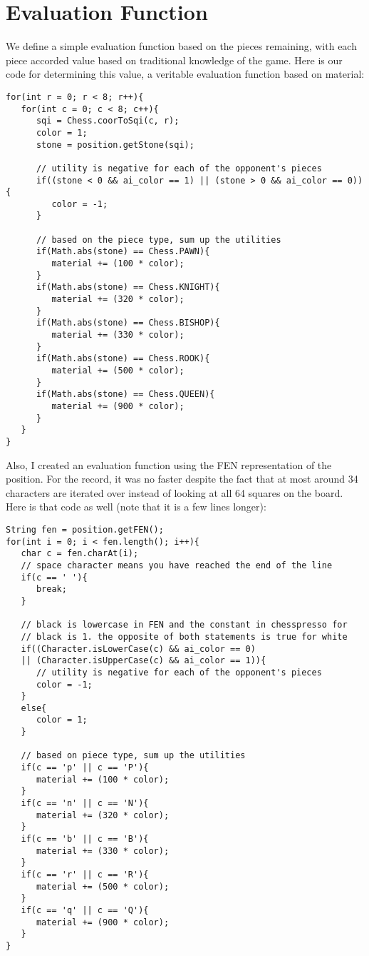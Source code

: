 \documentclass[11pt, oneside]{article}%
\begin{document}
\section{Evaluation Function}
We define a simple evaluation function based on the pieces remaining, with each piece accorded value based on traditional knowledge of the game.  Here is our code for determining this value, a veritable evaluation function based on material:
\begin{lstlisting}
for(int r = 0; r < 8; r++){
   for(int c = 0; c < 8; c++){
      sqi = Chess.coorToSqi(c, r);
      color = 1;
      stone = position.getStone(sqi);

      // utility is negative for each of the opponent's pieces
      if((stone < 0 && ai_color == 1) || (stone > 0 && ai_color == 0)){
         color = -1;
      }

      // based on the piece type, sum up the utilities
      if(Math.abs(stone) == Chess.PAWN){
         material += (100 * color);
      }
      if(Math.abs(stone) == Chess.KNIGHT){
         material += (320 * color);
      }
      if(Math.abs(stone) == Chess.BISHOP){
         material += (330 * color);
      }
      if(Math.abs(stone) == Chess.ROOK){
         material += (500 * color);
      }
      if(Math.abs(stone) == Chess.QUEEN){
         material += (900 * color);
      }
   }
}
\end{lstlisting}
\newpage
Also, I created an evaluation function using the FEN representation of the position.  For the record, it was no faster despite the fact that at most around 34 characters are iterated over instead of looking at all 64 squares on the board.  Here is that code as well (note that it is a few lines longer):

\begin{lstlisting}
String fen = position.getFEN();
for(int i = 0; i < fen.length(); i++){
   char c = fen.charAt(i);
   // space character means you have reached the end of the line
   if(c == ' '){
      break;
   }
            
   // black is lowercase in FEN and the constant in chesspresso for
   // black is 1. the opposite of both statements is true for white
   if((Character.isLowerCase(c) && ai_color == 0) 
   || (Character.isUpperCase(c) && ai_color == 1)){
      // utility is negative for each of the opponent's pieces
      color = -1;
   }
   else{
      color = 1;
   }
         
   // based on piece type, sum up the utilities
   if(c == 'p' || c == 'P'){
      material += (100 * color);
   }
   if(c == 'n' || c == 'N'){
      material += (320 * color);
   }
   if(c == 'b' || c == 'B'){
      material += (330 * color);
   }
   if(c == 'r' || c == 'R'){
      material += (500 * color);
   }
   if(c == 'q' || c == 'Q'){
      material += (900 * color);
   }
}
\end{lstlisting}
\end{document}
